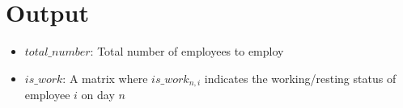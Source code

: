 \documentclass{article}
\begin{document}
\section*{Output}
\begin{itemize}
    \item \( total\_number \): Total number of employees to employ
    \item \( is\_work \): A matrix where \( is\_work_{n,i} \) indicates the working/resting status of employee \( i \) on day \( n \)
\end{itemize}
\end{document}
